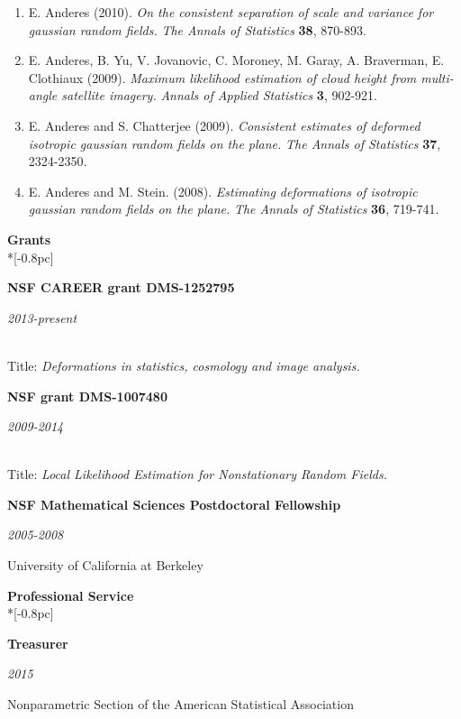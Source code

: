 \documentclass[11pt]{article}
\newcommand{\head}[1]{
  \vspace{10pt}
  {\Large \bf #1} \\*[-0.8pc]
  \underline{\hspace{6.07in}}}
\newcommand{\datedentry}[2]{
  \vspace{5pt}
  \begin{minipage}{5in}{\textbf{#1}}\end{minipage}
  \hfill
  \begin{minipage}{1in}{\hfill\textit{#2}}\end{minipage}
  }
\begin{document}
\begin{enumerate}[labelindent=0pt]
\item
E. Anderes (2010).  \textsl{On the consistent separation of scale and variance for gaussian random fields.} \textit{The Annals of Statistics} {\bf 38}, 870-893.



\item
E. Anderes, B. Yu, V. Jovanovic, C. Moroney, M. Garay, A. Braverman, E. Clothiaux (2009).
\textsl{Maximum likelihood estimation of cloud height from multi-angle satellite imagery.}   \textit{Annals of Applied Statistics} {\bf 3}, 902-921.


\item
E. Anderes and S. Chatterjee (2009). \textsl{Consistent estimates of deformed isotropic gaussian random fields on the plane.} \textit{The Annals of Statistics} {\bf 37}, 2324-2350.



\item
E. Anderes and M. Stein. (2008). \textsl{Estimating deformations of isotropic gaussian random fields on the plane.} \textit{The Annals of Statistics} {\bf 36}, 719-741.


 \end{enumerate}


%
%

\head{Grants}%
 \vspace{.1mm}


\datedentry{NSF CAREER grant DMS-1252795}{2013-present}\\
Title: {\sl Deformations in statistics, cosmology and image analysis.}

\vspace{7pt}

\datedentry{NSF grant DMS-1007480 }{2009-2014}\\
Title: {\sl Local Likelihood Estimation for Nonstationary Random Fields.}

\vspace{9pt}

\datedentry{NSF Mathematical Sciences Postdoctoral Fellowship}{2005-2008}
University of California at Berkeley


\head{Professional Service}


\datedentry{Treasurer}{2015}
Nonparametric Section of the American Statistical Association

\vspace{7pt}
\end{document}
